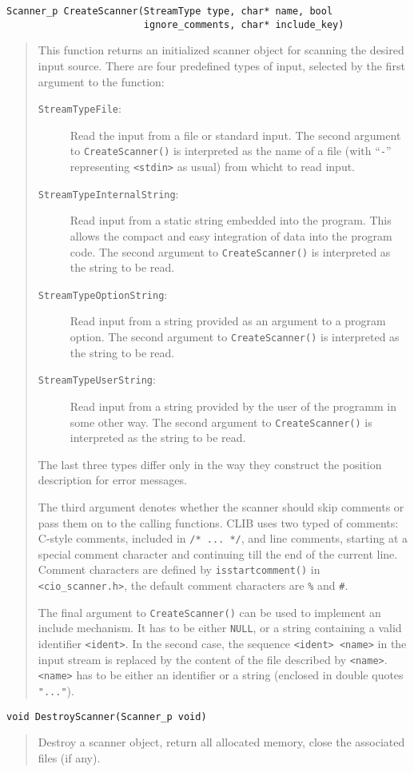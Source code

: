 \begin{verbatim}
Scanner_p CreateScanner(StreamType type, char* name, bool
                        ignore_comments, char* include_key)
\end{verbatim}
\begin{quote}
  This function returns an initialized scanner object for scanning the
  desired input source. There are four predefined types of input,
  selected by the first argument to the function:

  \begin{description}
  \item[\texttt{StreamTypeFile}:] Read the input from a file or
    standard input. The second argument to \texttt{CreateScanner()} is
    interpreted as the name of a file (with ``\texttt{-}''
    representing \texttt{<stdin>} as usual) from whicht to read
    input. 
  \item[\texttt{StreamTypeInternalString}:] Read input from a static
    string embedded into the program. This allows the compact and easy
    integration of data into the program code. The second argument to
    \texttt{CreateScanner()} is interpreted as the string to be
    read.
  \item[\texttt{StreamTypeOptionString}:] Read input from a string
    provided as an argument to a program option. The second argument
    to \texttt{CreateScanner()} is interpreted as the string to be
    read.
  \item[\texttt{StreamTypeUserString}:] Read input from a string
    provided by the user of the programm in some other way. The second
    argument to \texttt{CreateScanner()} is interpreted as the string
    to be read.
  \end{description}
  
  The last three types differ only in the way they construct the
  position description for error messages. 
  
  The third argument denotes whether the scanner should skip comments
  or pass them on to the calling functions. CLIB uses two typed of
  comments: C-style comments, included in \texttt{/* ... */}, and line
  comments, starting at a special comment character and continuing
  till the end of the current line. Comment characters are defined by
  \texttt{isstartcomment()} in \texttt{<cio\_scanner.h>}, the default
  comment characters are \texttt{\%} and \texttt{\#}.
  
  The final argument to \texttt{CreateScanner()} can be used to
  implement an include mechanism.  It has to be either \texttt{NULL},
  or a string containing a valid identifier \texttt{<ident>}. In the
  second case, the sequence \texttt{<ident> <name>} in the input
  stream is replaced by the content of the file described by
  \texttt{<name>}. \texttt{<name>} has to be either an identifier or a
  string (enclosed in double quotes \texttt{"..."}).
\end{quote}
\begin{verbatim}
void DestroyScanner(Scanner_p void)
\end{verbatim}
\begin{quote}
  Destroy a scanner object, return all allocated memory, close the
  associated files (if any).
\end{quote}


